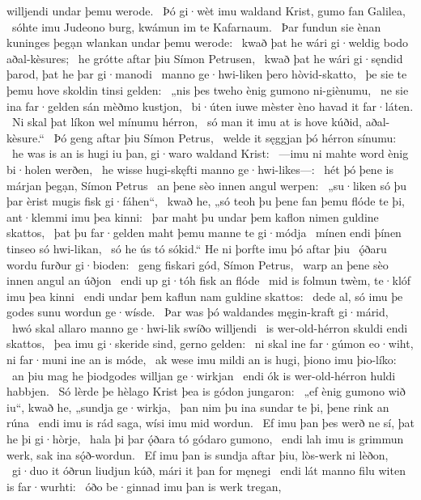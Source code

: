 willjendi undar þemu werode. \hld\ Þó gi·wèt imu waldand Krist,
gumo fan Galilea, \hld\ sóhte imu Judeono burg,
kwámun im te Kafarnaum. \hld\ Þar fundun sie ènan kuninges þegạn
wlankan undar þemu werode: \hld\ kwað þat he wári gi·weldig bodo
aðal-kèsures; \hld\ he grótte aftar þiu
Símon Petrusen, \hld\ kwað þat he wári gi·sęndid þarod,
þat he þar gi·manodi \hld\ manno ge·hwi-liken
þero hòvid-skatto, \hld\ þe sie te þemu hove skoldin
tinsi gelden: \hld\ „nis þes tweho ènig
gumono ni-giènumu, \hld\ ne sie ina far·gelden sán
mèðmo kustjon, \hld\ bi·úten iuwe mèster èno
havad it far·láten. \hld\ Ni skal þat líkon wel
mínumu hérron, \hld\ só man it imu at is hove kúðid,
aðal-kèsure.“ \hld\ Þó geng aftar þiu
Símon Petrus, \hld\ welde it sęggjan þó
hérron sínumu: \hld\ he was is an is hugi iu þan, %
gi·waro waldand Krist: \hld\ —imu ni mahte word ènig
bi·holen werðen, \hld\ he wisse hugi-skęfti
manno ge·hwi-likes—: \hld\ hét þó þene is márjan þegạn,
Símon Petrus \hld\ an þene sèo innen
angul werpen: \hld\ „su·liken só þu þar èrist mugis
fisk gi·fáhen“, \hld\ kwað he, „só teoh þu þene fan þemu flóde te þi,
ant·klemmi imu þea kinni: \hld\ þar maht þu undar þem kaflon nimen
guldine skattos, \hld\ þat þu far·gelden maht
þemu manne te gi·módja \hld\ mínen endi þínen
tinseo só hwi-likan, \hld\ só he ús tó sókid.“
He ni þorfte imu þó aftar þiu \hld\ ǫ́ðaru wordu
furður gi·bioden: \hld\ geng fiskari gód,
Símon Petrus, \hld\ warp an þene sèo innen
angul an úðjon \hld\ endi up gi·tóh
fisk an flóde \hld\ mid is folmun twèm,
te·klóf imu þea kinni \hld\ endi undar þem kaflun nam
guldine skattos: \hld\ dede al, só imu þe godes sunu
wordun ge·wísde. \hld\ Þar was þó waldandes
męgin-kraft gi·márid, \hld\ hwó skal allaro manno ge·hwi-lik
swíðo willjendi \hld\ is wer-old-hérron
skuldi endi skattos, \hld\ þea imu gi·skeride sind,
gerno gelden: \hld\ ni skal ine far·gúmon eo·wiht,
ni far·muni ine an is móde, \hld\ ak wese imu mildi an is hugi,
þiono imu þio-líko: \hld\ an þiu mag he þiodgodes
willjan ge·wirkjan \hld\ endi ók is wer-old-hérron
huldi habbjen. \hld\ Só lèrde þe hèlago Krist
þea is gódon jungaron: \hld\ „ef ènig gumono wið iu“, kwað he,
„sundja ge·wirkja, \hld\ þan nim þu ina sundar te þi,
þene rink an rúna \hld\ endi imu is rád saga,
wísi imu mid wordun. \hld\ Ef imu þan þes werð ne sí,
þat he þi gi·hòrje, \hld\ hala þi þar ǫ́ðara tó
gódaro gumono, \hld\ endi lah imu is grimmun werk,
sak ina sǫ́ð-wordun. \hld\ Ef imu þan is sundja aftar þiu,
lòs-werk ni lèðon, \hld\ gi·duo it óðrun liudjun kúð,
mári it þan for męnegi \hld\ endi lát manno filu
witen is far·wurhti: \hld\ óðo be·ginnad imu þan is werk tregan,
